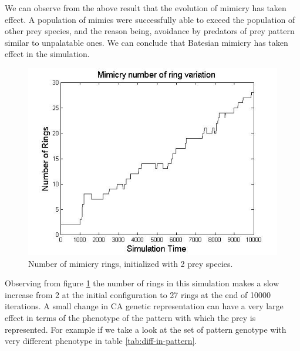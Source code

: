 \documentclass[letterpaper]{article}
\numberwithin{equation}{section}
\begin{document}
We can observe from the above result that the evolution of mimicry has taken effect. A population of mimics were successfully able to exceed the population of other prey species, and the reason being, avoidance by predators of prey pattern similar to unpalatable ones. We can conclude that Batesian mimicry has taken effect in the simulation.

\begin{figure}[H]
	\centering
	\includegraphics[scale=0.50]{../tex/images/ringSize10k-2Prey}
	\caption[Number of mimicry rings (2 prey species)]{Number of mimicry rings, initialized with 2 prey species.}
	\label{fig:ringSize10k-2Prey}
\end{figure}

Observing from figure \ref{fig:ringSize10k-2Prey} the number of rings in this simulation makes a slow increase from 2 at the initial configuration to 27 rings at the end of 10000 iterations. A small change in CA genetic representation can have a very large effect in terms of the phenotype of the pattern with which the prey is represented. For example if we take a look at the set of pattern genotype with very different phenotype in table \ref{tab:diff-in-pattern}.
\end{document}
